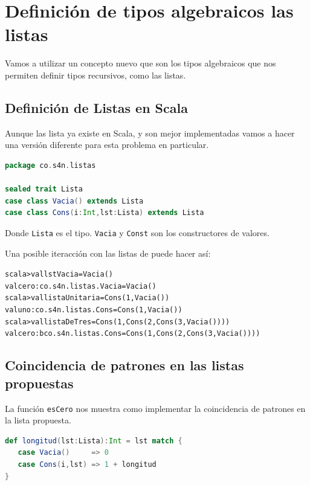 \documentclass[12pt]{article}
\newcounter{problema}
\begin{document}
\section{Definición de tipos algebraicos las listas}
\label{sec:definicio-de-tipos}

Vamos a utilizar un concepto nuevo que son los tipos algebraicos que nos permiten definir tipos recursivos, como las listas.

\subsection{Definición de Listas en Scala}
\label{sec:def-naturales}

Aunque las lista ya existe en Scala, y son mejor implementadas vamos a
hacer una versión diferente para esta problema en particular.

\begin{lstlisting}[language=Scala]
package co.s4n.listas

sealed trait Lista
case class Vacia() extends Lista
case class Cons(i:Int,lst:Lista) extends Lista
\end{lstlisting}

Donde \texttt{Lista} es el tipo. \texttt{Vacia} y \texttt{Const} son los constructores de valores.

Una posible iteracción con las listas de puede hacer así:

\begin{alltt}
scala> val lstVacia = Vacia()
val cero: co.s4n.listas.Vacia = Vacia()
scala> val listaUnitaria = Cons(1, Vacia())
val uno: co.s4n.listas.Cons = Cons(1, Vacia())
scala> val listaDeTres = Cons(1,Cons(2,Cons(3,Vacia())))
val cero: bco.s4n.listas.Cons = Cons(1,Cons(2,Cons(3,Vacia())))
\end{alltt}

\subsection{Coincidencia de patrones en las listas propuestas}
\label{sec:pat-nat}

La función \texttt{esCero} nos muestra como implementar la coincidencia de patrones en la lista propuesta.

\begin{lstlisting}[language=Scala]
def longitud(lst:Lista):Int = lst match {
   case Vacia()     => 0
   case Cons(i,lst) => 1 + longitud
}
\end{lstlisting}
\end{document}

